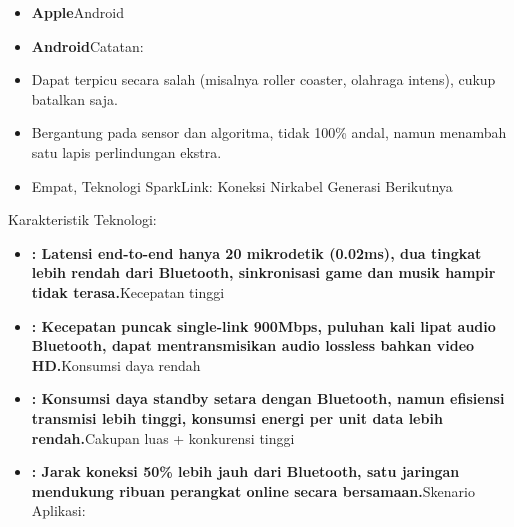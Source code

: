 
\begin{itemize}
  \item \textbf{Apple}Android
  \item \textbf{Android}Catatan:
\end{itemize}


\begin{itemize}
  \item Dapat terpicu secara salah (misalnya roller coaster, olahraga intens), cukup batalkan saja.
  \item Bergantung pada sensor dan algoritma, tidak 100\% andal, namun menambah satu lapis perlindungan ekstra.
  \item Empat, Teknologi SparkLink: Koneksi Nirkabel Generasi Berikutnya
\end{itemize}


Karakteristik Teknologi:


\begin{itemize}
  \item \textbf{: Latensi end-to-end hanya 20 mikrodetik (0.02ms), dua tingkat lebih rendah dari Bluetooth, sinkronisasi game dan musik hampir tidak terasa.}Kecepatan tinggi
  \item \textbf{: Kecepatan puncak single-link 900Mbps, puluhan kali lipat audio Bluetooth, dapat mentransmisikan audio lossless bahkan video HD.}Konsumsi daya rendah
  \item \textbf{: Konsumsi daya standby setara dengan Bluetooth, namun efisiensi transmisi lebih tinggi, konsumsi energi per unit data lebih rendah.}Cakupan luas + konkurensi tinggi
  \item \textbf{: Jarak koneksi 50\% lebih jauh dari Bluetooth, satu jaringan mendukung ribuan perangkat online secara bersamaan.}Skenario Aplikasi:
\end{itemize}

